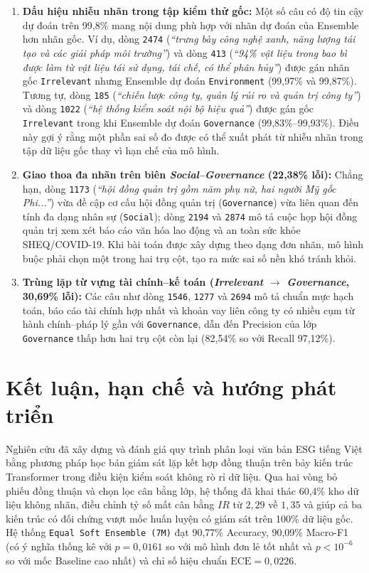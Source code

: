 \documentclass[journal,a4paper]{IEEEtran}
\newcommand{\code}[1]{\texttt{\small #1}}
\begin{document}
\begin{enumerate}[leftmargin=*, itemsep=2pt, topsep=2pt]
  \item \textbf{Dấu hiệu nhiễu nhãn trong tập kiểm thử gốc:} Một số câu có độ tin cậy dự đoán trên 99,8\% mang nội dung phù hợp với nhãn dự đoán của Ensemble hơn nhãn gốc. Ví dụ, dòng \code{2474} (\textit{``trưng bày công nghệ xanh, năng lượng tái tạo và các giải pháp môi trường''}) và dòng \code{413} (\textit{``94\% vật liệu trong bao bì được làm từ vật liệu tái sử dụng, tái chế, có thể phân hủy''}) được gán nhãn gốc \code{Irrelevant} nhưng Ensemble dự đoán \code{Environment} (99,97\% và 99,87\%). Tương tự, dòng \code{185} (\textit{``chiến lược công ty, quản lý rủi ro và quản trị công ty''}) và dòng \code{1022} (\textit{``hệ thống kiểm soát nội bộ hiệu quả''}) được gán gốc \code{Irrelevant} trong khi Ensemble dự đoán \code{Governance} (99,83\%--99,93\%). Điều này gợi ý rằng một phần sai số đo được có thể xuất phát từ nhiễu nhãn trong tập dữ liệu gốc thay vì hạn chế của mô hình.
  \item \textbf{Giao thoa đa nhãn trên biên \textit{Social--Governance} (22,38\% lỗi):} Chẳng hạn, dòng \code{1173} (\textit{``hội đồng quản trị gồm năm phụ nữ, hai người Mỹ gốc Phi...''}) vừa đề cập cơ cấu hội đồng quản trị (\code{Governance}) vừa liên quan đến tính đa dạng nhân sự (\code{Social}); dòng \code{2194} và \code{2874} mô tả cuộc họp hội đồng quản trị xem xét báo cáo văn hóa lao động và an toàn sức khỏe SHEQ/COVID-19. Khi bài toán được xây dựng theo dạng đơn nhãn, mô hình buộc phải chọn một trong hai trụ cột, tạo ra mức sai số nền khó tránh khỏi.
  \item \textbf{Trùng lặp từ vựng tài chính--kế toán (\textit{Irrelevant $\rightarrow$ Governance}, 30,69\% lỗi):} Các câu như dòng \code{1546}, \code{1277} và \code{2694} mô tả chuẩn mực hạch toán, báo cáo tài chính hợp nhất và khoản vay liên công ty có nhiều cụm từ hành chính--pháp lý gần với \code{Governance}, dẫn đến Precision của lớp \code{Governance} thấp hơn hai trụ cột còn lại (82,54\% so với Recall 97,12\%).
\end{enumerate}

\section{Kết luận, hạn chế và hướng phát triển}
\label{sec:conclusion}

Nghiên cứu đã xây dựng và đánh giá quy trình phân loại văn bản ESG tiếng Việt bằng phương pháp học bán giám sát lặp kết hợp đồng thuận trên bảy kiến trúc Transformer trong điều kiện kiểm soát không rò rỉ dữ liệu. Qua hai vòng bỏ phiếu đồng thuận và chọn lọc cân bằng lớp, hệ thống đã khai thác 60,4\% kho dữ liệu không nhãn, điều chỉnh tỷ số mất cân bằng $IR$ từ $2{,}29$ về $1{,}35$ và giúp cả ba kiến trúc có đối chứng vượt mốc huấn luyện có giám sát trên 100\% dữ liệu gốc. Hệ thống \code{Equal Soft Ensemble (7M)} đạt 90,77\% Accuracy, 90,09\% Macro-F1 (có ý nghĩa thống kê với $p = 0{,}0161$ so với mô hình đơn lẻ tốt nhất và $p < 10^{-6}$ so với mốc Baseline cao nhất) và chỉ số hiệu chuẩn $\text{ECE} = 0{,}0226$.
\end{document}
